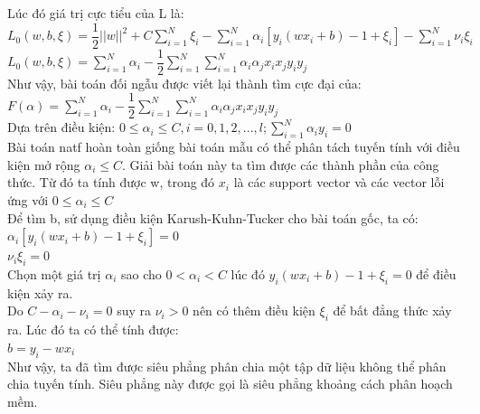 \documentclass[12pt,a4paper]{article}
\begin{document}
Lúc đó giá trị cực tiểu của L là:\\
\indent $L_0(w,b,\xi) = \dfrac{1}{2}||w||^2 + C\sum_{i=1}^N\xi_i - \sum_{i=1}^N \alpha_i[y_i(wx_i+b)-1+\xi_i]-\sum_{i=1}^N\nu_i\xi_i$\\
\indent $L_0(w,b,\xi) = \sum_{i=1}^N\alpha_i - \dfrac{1}{2}\sum_{i=1}^N\sum_{i=1}^N\alpha_i\alpha_jx_ix_jy_iy_j$\\
Như vậy, bài toán đối ngẫu được viết lại thành tìm cực đại của:\\
\indent $F(\alpha) =\sum_{i=1}^N\alpha_i - \dfrac{1}{2}\sum_{i=1}^N\sum_{i=1}^N\alpha_i\alpha_jx_ix_jy_iy_j$\\
Dựa trên điều kiện: $0\leq \alpha_i \leq C, i=0,1,2,...,l; \sum_{i=1}^N\alpha_iy_i=0$\\
\indent Bài toán natf hoàn toàn giống bài toán mẫu có thể phân tách tuyến tính với điều kiện mở rộng $\alpha_i \leq C$. Giải bài toán này ta tìm được các thành phần của công thức. Từ đó ta tính được w, trong đó $x_i$ là các support vector và các vector lỗi ứng với $0 \leq \alpha_i \leq C$\\
Để tìm b, sử dụng điều kiện Karush-Kuhn-Tucker cho bài toán gốc, ta có:\\
\indent $\alpha_i[y_i(wx_i+b)-1+\xi_i] = 0$\\
\indent $\nu_i\xi_i=0$\\
Chọn một giá trị $\alpha_i$ sao cho $0<\alpha_i<C$ lúc đó \indent $y_i(wx_i+b)-1+\xi_i=0$ để điều kiện xảy ra.\\
\indent Do $C-\alpha_i - \nu_i =0$ suy ra $\nu_i > 0$ nên có thêm điều kiện $\xi_i$ để bất đẳng thức xảy ra. Lúc đó ta có thể tính được:\\
$b = y_i -wx_i$\\
\indent Như vậy, ta đã tìm được siêu phẳng phân chia một tập dữ liệu không thể phân chia tuyến tính. Siêu phẳng này được gọi là siêu phẳng khoảng cách phân hoạch mềm.
\end{document}

